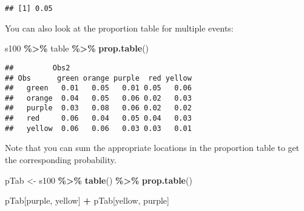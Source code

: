 \documentclass[
]{article}
\newenvironment{Shaded}{\begin{snugshade}}{\end{snugshade}}
\newcommand{\FunctionTok}[1]{\textcolor[rgb]{0.13,0.29,0.53}{\textbf{#1}}}
\newcommand{\NormalTok}[1]{#1}
\newcommand{\OtherTok}[1]{\textcolor[rgb]{0.56,0.35,0.01}{#1}}
\newcommand{\SpecialCharTok}[1]{\textcolor[rgb]{0.81,0.36,0.00}{\textbf{#1}}}
\newcommand{\StringTok}[1]{\textcolor[rgb]{0.31,0.60,0.02}{#1}}
\begin{document}
\begin{Shaded}
\end{Shaded}

\begin{verbatim}
## [1] 0.05
\end{verbatim}

You can also look at the proportion table for multiple events:

\begin{Shaded}
\begin{Highlighting}[]
\NormalTok{s100 }\SpecialCharTok{\%\textgreater{}\%}
\NormalTok{  table }\SpecialCharTok{\%\textgreater{}\%}
  \FunctionTok{prop.table}\NormalTok{()}
\end{Highlighting}
\end{Shaded}

\begin{verbatim}
##         Obs2
## Obs      green orange purple  red yellow
##   green   0.01   0.05   0.01 0.05   0.06
##   orange  0.04   0.05   0.06 0.02   0.03
##   purple  0.03   0.08   0.06 0.02   0.02
##   red     0.06   0.04   0.05 0.04   0.03
##   yellow  0.06   0.06   0.03 0.03   0.01
\end{verbatim}

Note that you can sum the appropriate locations in the proportion table
to get the corresponding probability.

\begin{Shaded}
\begin{Highlighting}[]
\NormalTok{pTab }\OtherTok{\textless{}{-}}\NormalTok{ s100 }\SpecialCharTok{\%\textgreater{}\%}
  \FunctionTok{table}\NormalTok{() }\SpecialCharTok{\%\textgreater{}\%}
  \FunctionTok{prop.table}\NormalTok{()}

\NormalTok{pTab[}\StringTok{\textquotesingle{}purple\textquotesingle{}}\NormalTok{, }\StringTok{\textquotesingle{}yellow\textquotesingle{}}\NormalTok{] }\SpecialCharTok{+}\NormalTok{ pTab[}\StringTok{\textquotesingle{}yellow\textquotesingle{}}\NormalTok{, }\StringTok{\textquotesingle{}purple\textquotesingle{}}\NormalTok{]}
\end{Highlighting}
\end{Shaded}
\end{document}
